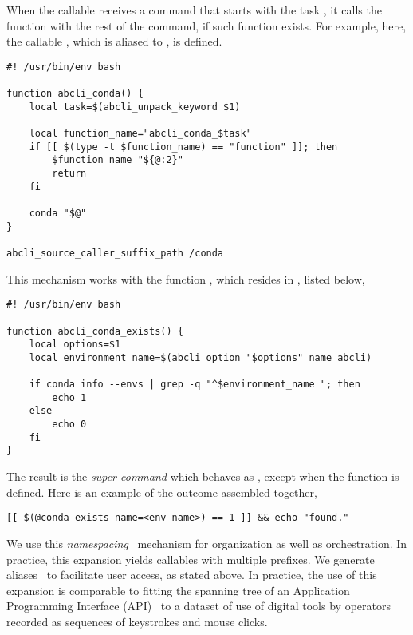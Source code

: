 When the callable  receives a command that starts with the task , it calls the function  with the rest of the command, if such function exists. For example, here, the callable , which is aliased to , is defined.

\begin{verbatim}
#! /usr/bin/env bash

function abcli_conda() {
    local task=$(abcli_unpack_keyword $1)

    local function_name="abcli_conda_$task"
    if [[ $(type -t $function_name) == "function" ]]; then
        $function_name "${@:2}"
        return
    fi

    conda "$@"
}

abcli_source_caller_suffix_path /conda
\end{verbatim}
%
This mechanism works with the function , which resides in , listed below,
%
\begin{verbatim}
#! /usr/bin/env bash

function abcli_conda_exists() {
    local options=$1
    local environment_name=$(abcli_option "$options" name abcli)

    if conda info --envs | grep -q "^$environment_name "; then
        echo 1
    else
        echo 0
    fi
}    
\end{verbatim}
%
The result is the \emph{super-command}  which behaves as , except when the function  is defined. Here is an example of the outcome assembled together,
%
\begin{verbatim}
[[ $(@conda exists name=<env-name>) == 1 ]] && echo "found."
\end{verbatim}
%
We use this \emph{namespacing}~\cite{namespaces} mechanism for organization as well as orchestration. In practice, this expansion yields callables with multiple prefixes. We generate  aliases~\cite{aliases} to facilitate user access, as stated above. In practice, the use of this expansion is comparable to fitting the spanning tree of an Application Programming Interface (API)~\cite{fielding2000rest} to a dataset of use of digital tools by operators recorded as sequences of keystrokes and mouse clicks.